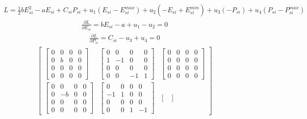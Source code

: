 \documentclass[11pt]{article} %
\begin{document}
\begin{align} 
    L = \frac{1}{2}bE_{si}^2 -aE_{si} + C_{si}P_{si} + u_1(E_{si} - E_{si}^{max}) + u_2(-E_{si} + E_{si}^{min}) +
     u_3(-P_{si}) + u_4(P_{si} - P_{si}^{max})
\end{align}
\begin{align}  
    \frac{\partial L}{\partial E_{si}} = bE_{si} - a + u_1 - u_2= 0 
\end{align}
\begin{align}  
    \frac{\partial L}{\partial P_{si}} = C_{si} - u_3 + u_4= 0 
\end{align}
\begin{align}  
    \begin{bmatrix}
         \begin{bmatrix}
            0 & 0 & 0 & 0\\
            0 & b  & 0 & 0\\
            0 & 0 & 0 & 0\\
            0 & 0 & 0 & 0
        \end{bmatrix}  & 
        \begin{bmatrix}
            0 & 0 & 0 & 0\\
            1 & -1 & 0 & 0\\
            0 & 0 & 0 & 0\\
            0 & 0 & -1 & 1
        \end{bmatrix}  &
        \begin{bmatrix}
            0 & 0 & 0 & 0\\
            0 & 0 & 0 & 0\\
            0 & 0 & 0 & 0\\
            0 & 0 & 0 & 0
        \end{bmatrix} \\
        \begin{bmatrix}
            0 & 0 & 0 & 0\\
            0 & -b  & 0 & 0\\
            0 & 0 & 0 & 0\\
            0 & 0 & 0 & 0
        \end{bmatrix}  & 
        \begin{bmatrix}
            0 & 0 & 0 & 0\\
            -1 & 1 & 0 & 0\\
            0 & 0 & 0 & 0\\
            0 & 0 & 1 & -1
        \end{bmatrix}  &
        \begin{bmatrix}

\end{bmatrix}
\end{bmatrix}
\end{align}
\end{document}
